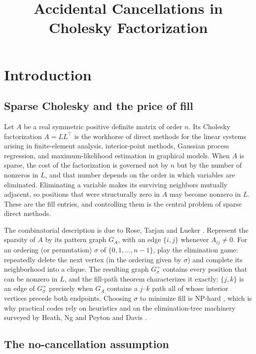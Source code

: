 \documentclass[11pt]{article}
\title{Accidental Cancellations in Cholesky Factorization}
\theoremstyle{plain}
\theoremstyle{definition}
\begin{document}
\maketitle




    

\section{Introduction}
\begin{humanblock}
\subsection{Sparse Cholesky and the price of fill}

Let $A$ be a real symmetric positive definite matrix of order $n$. Its Cholesky factorization $A = LL^\top$ is the workhorse of direct methods for the linear systems arising in finite-element analysis, interior-point methods, Gaussian process regression, and maximum-likelihood estimation in graphical models. When $A$ is sparse, the cost of the factorization is governed not by $n$ but by the number of nonzeros in $L$, and that number depends on the order in which variables are eliminated. Eliminating a variable makes its surviving neighbors mutually adjacent, so positions that were structurally zero in $A$ may become nonzero in $L$. These are the fill entries, and controlling them is the central problem of sparse direct methods.

The combinatorial description is due to Rose, Tarjan and Lueker \cite{Rose}. Represent the sparsity of $A$ by its pattern graph $G_A$, with an edge $\{i,j\}$ whenever $A_{ij} \neq 0$. For an ordering (or permutation) $\sigma$ of $\{0,1,\dots,n-1\}$, play the elimination game: repeatedly delete the next vertex (in the ordering given by $\sigma$) and complete its neighborhood into a clique. The resulting graph $G^+_\sigma$ contains every position that can be nonzero in $L$, and the fill-path theorem characterizes it exactly: $\{j,k\}$ is an edge of $G^+_\sigma$ precisely when $G_A$ contains a $j$--$k$ path all of whose interior vertices precede both endpoints. Choosing $\sigma$ to minimize fill is NP-hard \cite{Yannakakis}, which is why practical codes rely on heuristics and on the elimination-tree machinery surveyed by Heath, Ng and Peyton \cite{Heath} and Davis \cite{Davis}.

\subsection{The no-cancellation assumption}


\end{humanblock}
\end{document}
